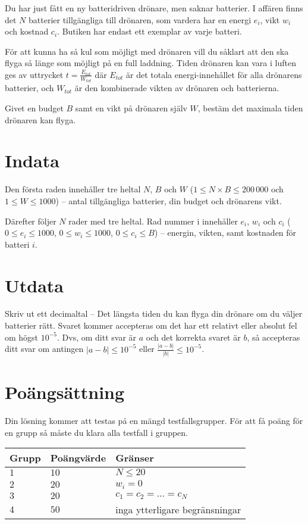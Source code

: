 
Du har just fått en ny batteridriven drönare, men saknar batterier.
I affären finns det $N$ batterier tillgängliga till drönaren,
som vardera har en energi $e_i$, vikt $w_i$ och kostnad $c_i$.
Butiken har endast ett exemplar av varje batteri.

För att kunna ha så kul som möjligt med drönaren vill du såklart att den ska
flyga så länge som möjligt på en full laddning.
Tiden drönaren kan vara i luften ges av uttrycket $t = \frac{E_{tot}}{W_{tot}}$ där $E_{tot}$
är det totala energi-innehållet för alla drönarens batterier, och $W_{tot}$ är den kombinerade vikten av drönaren och batterierna. 

Givet en budget $B$ samt en vikt på drönaren själv $W$, bestäm
det maximala tiden drönaren kan flyga.


\section*{Indata}
Den första raden innehåller tre heltal $N$, $B$ och $W$
($1 \le N\times B \le 200\,000$ och $1\le W \le 1000$) -- antal tillgängliga batterier, din budget och drönarens vikt.

Därefter följer $N$ rader med tre heltal. Rad nummer i innehåller $e_i$,
$w_i$ och $c_i$ ($0 \le e_i \le 1000$, $0 \le w_i \le 1000$, $0 \le c_i \le B$) 
-- energin, vikten, samt kostnaden för batteri $i$.

\section*{Utdata}
Skriv ut ett decimaltal -- Det längsta tiden du kan flyga din drönare om du väljer batterier rätt. 
Svaret kommer accepteras om det har ett relativt eller absolut fel om högst $10^{-5}$.
Dvs, om ditt svar är $a$ och det korrekta svaret är $b$, så accepteras ditt svar om
antingen $|a-b| \le 10^{-5}$ eller $\frac{|a-b|}{|b|} \le 10^{-5}$.

\section*{Poängsättning}
Din lösning kommer att testas på en mängd testfallsgrupper.
För att få poäng för en grupp så måste du klara alla testfall i gruppen.

\noindent
\begin{tabular}{| l | l | l |}
  \hline
  Grupp & Poängvärde & Gränser \\ \hline
  $1$   & $10$       & $N \leq 20$ \\ \hline
  $2$   & $20$       & $w_i = 0$ \\ \hline
  $3$   & $20$       & $c_1 = c_2 = ... = c_N$ \\ \hline
  $4$   & $50$       & inga ytterligare begränsningar \\ \hline
\end{tabular}

